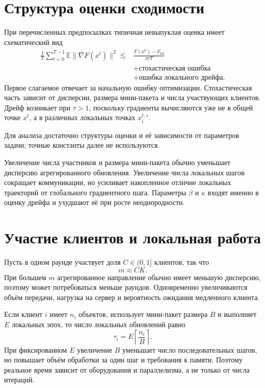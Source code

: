 \section{Структура оценки сходимости}

При перечисленных предпосылках типичная невыпуклая оценка имеет
схематический вид
\[
\begin{aligned}
    \frac1T
    \sum_{t=0}^{T-1}
    \mathbb E
    \lVert\nabla F(x^t)\rVert^2
    \lesssim{}&
    \frac{F(x^0)-F_{\inf}}{\eta\tau T}
    \\
    &+
    \text{стохастическая ошибка}
    \\
    &+
    \text{ошибка локального дрейфа}.
\end{aligned}
\]
Первое слагаемое отвечает за начальную ошибку оптимизации.
Стохастическая часть зависит от дисперсии, размера мини-пакета и числа
участвующих клиентов. Дрейф возникает при \(\tau>1\), поскольку
градиенты вычисляются уже не в общей точке \(x^t\), а в различных
локальных точках \(x_i^{t,s}\).

Для анализа достаточно структуры оценки и её зависимости от параметров задачи; точные константы далее не используются.

Увеличение числа участников и размера мини-пакета обычно уменьшает
дисперсию агрегированного обновления. Увеличение числа локальных шагов
сокращает коммуникации, но усиливает накопленное отличие локальных
траекторий от глобального градиентного шага. Параметры \(\beta\) и
\(\kappa\) входят именно в оценку дрейфа и ухудшают её при росте
неоднородности.

\section{Участие клиентов и локальная работа}

Пусть в одном раунде участвует доля \(C\in(0,1]\) клиентов, так что
\[
    m\approx CK.
\]
При большем \(m\) агрегированное направление обычно имеет меньшую
дисперсию, поэтому может потребоваться меньше раундов. Одновременно
увеличиваются объём передачи, нагрузка на сервер и вероятность
ожидания медленного клиента.

Если клиент \(i\) имеет \(n_i\) объектов, использует мини-пакет
размера \(B\) и выполняет \(E\) локальных эпох, то число локальных
обновлений равно
\[
    \tau_i
    =
    E
    \left\lceil
        \frac{n_i}{B}
    \right\rceil.
\]
При фиксированном \(E\) увеличение \(B\) уменьшает число
последовательных шагов, но повышает объём обработки за один шаг и
требования к памяти. Поэтому реальное время зависит от оборудования и
параллелизма, а не только от числа итераций.

